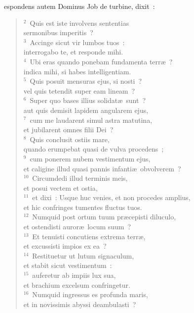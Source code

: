 \bchapter
{}espondens autem Dominus Job de turbine, dixit~:
\begin{flushleft}\begin{verse}\vspace{6pt}${}^{2}$~Quis est iste involvens sententias\\ sermonibus imperitis~?\\
${}^{3}$~Accinge sicut vir lumbos tuos~:\\ interrogabo te, et responde mihi.\\
${}^{4}$~Ubi eras quando ponebam fundamenta terr\ae~?\\ indica mihi, si habes intelligentiam.\\
${}^{5}$~Quis posuit mensuras ejus, si nosti~?\\ vel quis tetendit super eam lineam~?\\
${}^{6}$~Super quo bases illius solidat\ae\ sunt~?\\ aut quis demisit lapidem angularem ejus,\\
${}^{7}$~cum me laudarent simul astra matutina,\\ et jubilarent omnes filii Dei~?\\
${}^{8}$~Quis conclusit ostiis mare,\\ quando erumpebat quasi de vulva procedens~;\\
${}^{9}$~cum ponerem nubem vestimentum ejus,\\ et caligine illud quasi pannis infanti\ae\ obvolverem~?\\
${}^{10}$~Circumdedi illud terminis meis,\\ et posui vectem et ostia,\\
${}^{11}$~et dixi~: Usque huc venies, et non procedes amplius,\\ et hic confringes tumentes fluctus tuos.\\
${}^{12}$~Numquid post ortum tuum pr\ae cepisti diluculo,\\ et ostendisti auror\ae\ locum suum~?\\
${}^{13}$~Et tenuisti concutiens extrema terr\ae ,\\ et excussisti impios ex ea~?\\
${}^{14}$~Restituetur ut lutum signaculum,\\ et stabit sicut vestimentum~:\\
${}^{15}$~auferetur ab impiis lux sua,\\ et brachium excelsum confringetur.\\
${}^{16}$~Numquid ingressus es profunda maris,\\ et in novissimis abyssi deambulasti~?\\

\end{verse}
\end{flushleft}
